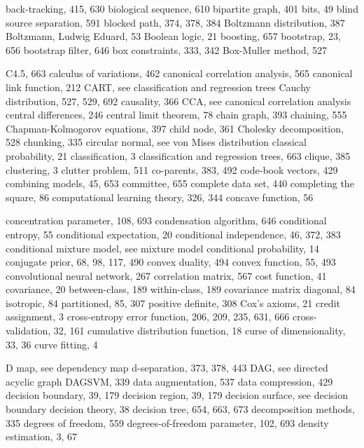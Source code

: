 \documentclass[
  10
]{article}
\begin{document}
back-tracking, 415, 630 biological sequence, 610 bipartite graph, 401
bits, 49 blind source separation, 591 blocked path, 374, 378, 384
Boltzmann distribution, 387 Boltzmann, Ludwig Eduard, 53 Boolean logic,
21 boosting, 657 bootstrap, 23, 656 bootstrap filter, 646 box
constraints, 333, 342 Box-Muller method, 527

C4.5, 663 calculus of variations, 462 canonical correlation analysis,
565 canonical link function, 212 CART, see classification and regression
trees Cauchy distribution, 527, 529, 692 causality, 366 CCA, see
canonical correlation analysis central differences, 246 central limit
theorem, 78 chain graph, 393 chaining, 555 Chapman-Kolmogorov equations,
397 child node, 361 Cholesky decomposition, 528 chunking, 335 circular
normal, see von Mises distribution classical probability, 21
classification, 3 classification and regression trees, 663 clique, 385
clustering, 3 clutter problem, 511 co-parents, 383, 492 code-book
vectors, 429 combining models, 45, 653 committee, 655 complete data set,
440 completing the square, 86 computational learning theory, 326, 344
concave function, 56

concentration parameter, 108, 693 condensation algorithm, 646
conditional entropy, 55 conditional expectation, 20 conditional
independence, 46, 372, 383 conditional mixture model, see mixture model
conditional probability, 14 conjugate prior, 68, 98, 117, 490 convex
duality, 494 convex function, 55, 493 convolutional neural network, 267
correlation matrix, 567 cost function, 41 covariance, 20 between-class,
189 within-class, 189 covariance matrix diagonal, 84 isotropic, 84
partitioned, 85, 307 positive definite, 308 Cox's axioms, 21 credit
assignment, 3 cross-entropy error function, 206, 209, 235, 631, 666
cross-validation, 32, 161 cumulative distribution function, 18 curse of
dimensionality, 33, 36 curve fitting, 4

D map, see dependency map d-separation, 373, 378, 443 DAG, see directed
acyclic graph DAGSVM, 339 data augmentation, 537 data compression, 429
decision boundary, 39, 179 decision region, 39, 179 decision surface,
see decision boundary decision theory, 38 decision tree, 654, 663, 673
decomposition methods, 335 degrees of freedom, 559 degrees-of-freedom
parameter, 102, 693 density estimation, 3, 67
\end{document}
